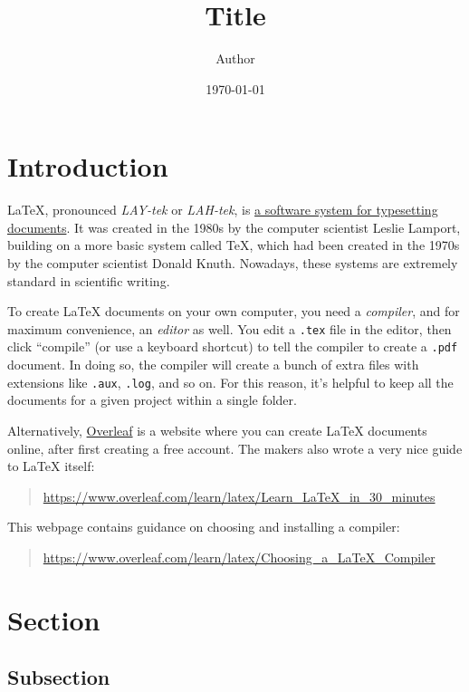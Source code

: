 \documentclass[a4paper,10pt,leqno]{article}
\numberwithin{equation}{section}
\theoremstyle{plain}
\theoremstyle{definition}
\theoremstyle{remark}
\begin{document}
\title{Title}
\author{Author}
\date{\today} %
\maketitle

\thispagestyle{empty}


\section{Introduction}

\LaTeX{}, pronounced \emph{LAY-tek} or \emph{LAH-tek}, is \href{https://en.wikipedia.org/wiki/LaTeX}{a software system for typesetting documents}.
It was created in the 1980s by the computer scientist Leslie Lamport, building on a more basic system called \TeX{}, which had been created in the 1970s by the computer scientist Donald Knuth.
Nowadays, these systems are extremely standard in scientific writing.

To create \LaTeX{} documents on your own computer, you need a \emph{compiler}, and for maximum convenience, an \emph{editor} as well.
You edit a \texttt{.tex} file in the editor, then click ``compile'' (or use a keyboard shortcut) to tell the compiler to create a \texttt{.pdf} document.
In doing so, the compiler will create a bunch of extra files with extensions like \texttt{.aux}, \texttt{.log}, and so on.
For this reason, it's helpful to keep all the documents for a given project within a single folder.

Alternatively, \href{https://www.overleaf.com/}{Overleaf} is a website where you can create \LaTeX{} documents online, after first creating a free account.
The makers also wrote a very nice guide to \LaTeX{} itself:
\begin{quote}  \url{https://www.overleaf.com/learn/latex/Learn_LaTeX_in_30_minutes}
\end{quote}
This webpage contains guidance on choosing and installing a compiler:
\begin{quote}
\url{https://www.overleaf.com/learn/latex/Choosing_a_LaTeX_Compiler}
\end{quote}

\section{Section}

\subsection{Subsection}
\end{document}
